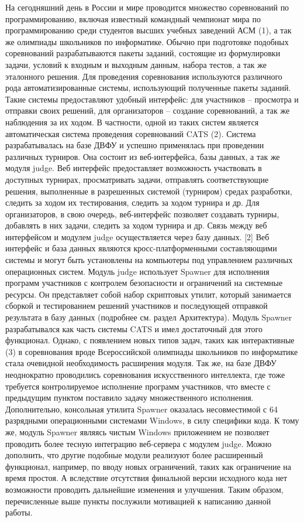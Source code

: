 \documentclass{imcs}
\begin{document}
На сегодняшний день в России и мире проводится множество соревнований по программированию, включая известный командный чемпионат мира по программированию среди студентов высших учебных заведений АСМ (1), а так же олимпиады школьников по информатике. Обычно при подготовке подобных соревнований разрабатываются пакеты заданий, состоящие из формулировки задачи, условий к входным и выходным данным,  набора тестов, а так же эталонного решения. Для проведения соревнования используются различного рода автоматизированные системы, использующий полученные пакеты заданий. Такие системы предоставляют удобный интерфейс: для участников – просмотра и отправки своих решений, для организаторов – создание соревнований, а так же наблюдения за их ходом.
В частности, одной из таких систем является автоматическая система проведения соревнований CATS (2). Система разрабатывалась на базе ДВФУ и успешно применялась при проведении различных турниров. Она состоит из веб-интерфейса, базы данных, а так же модуля judge.
Веб интерфейс предоставляет возможность участвовать в доступных турнирах, просматривать задачи, отправлять соответствующие решения, выполненные в разрешенных системой (турниром) средах разработки, следить за ходом их тестирования, следить за ходом турнира и др. Для организаторов, в свою очередь, веб-интерфейс позволяет создавать турниры, добавлять в них задачи, следить за ходом турнира и др.
Связь между веб интерфейсом и модулем judge осуществляется через базу данных. [2] Веб интерфейс и база данных являются кросс-платформенными составляющими системы и могут быть установлены на компьютеры под управлением различных операционных систем.
Модуль judge использует Spawner для исполнения программ участников с контролем безопасности и ограничений на системные ресурсы. Он представляет собой набор скриптовых утилит, который занимается сборкой и тестированием решений участников и последующей отправкой результата в базу данных (подробнее см. раздел Архитектура).
Модуль Spawner разрабатывался как часть системы CATS и имел достаточный для этого функционал. Однако, с появлением новых типов задач, таких как интерактивные (3) в соревнования вроде Всероссийской олимпиады школьников по информатике стала очевидной необходимость расширения модуля. Так же, на базе ДВФУ неоднократно проводились соревнования искусственного интеллекта, где тоже требуется контролируемое исполнение программ участников, что вместе с предыдущим пунктом поставило задачу множественного исполнения. Дополнительно, консольная утилита Spawner оказалась несовместимой с 64 разрядными операционными системами Windows, в силу специфики кода. К тому же, модуль Spawner являясь чистым Windows приложением не позволяет проводить более тесную интеграцию веб-сервера с модулем judge. Можно дополнить, что другие подобные модули реализуют более расширенный функционал, например, по вводу новых ограничений, таких как ограничение на время простоя. А вследствие отсутствия финальной версии исходного кода нет возможности проводить дальнейшие изменения и улучшения.
Таким образом, перечисленные выше пункты послужили мотивацией к написанию данной работы.
\end{document}
